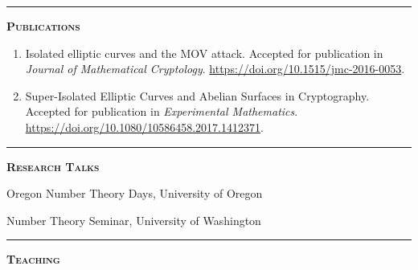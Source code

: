 \documentclass[12pt]{article}
\newcommand{\sectionheading}[1]
{
\bigskip %
\noindent
\hspace{-6.5mm}\textcolor{Gray}{\rule[.75mm]{21.5mm}{1mm}} %
\hspace{.2mm}	%
{\large{\textbf{\textsc{#1}}}} %
}
\newenvironment{date_section}
	{
	\vspace{-1ex}
	\leftmargini = 15ex
		\begin{itemize}[
			labelsep = *,
			labelwidth = 9ex,
			labelindent = 0ex,
			itemindent = !,
			font=\normalfont,
			align=parleft
		]{}
		\itemsep=-1.5mm
	}
	{\end{itemize}\vspace{-2ex}}
\newcommand{\yearmo}[2]{
	\item[
		{\makebox[1ex][r]{#1}}
		\hspace{1ex}
		{\makebox[1ex][l]{#2} }
		] }
\begin{document}
	\sectionheading{Publications}%
	
	\begin{enumerate}[itemsep=-1mm, leftmargin=24mm]
		
		\item
		{Isolated elliptic curves and the MOV attack}.
		Accepted for publication in \textit{Journal of Mathematical Cryptology}. 
		\url{https://doi.org/10.1515/jmc-2016-0053}.
		
		\item
		{Super-Isolated Elliptic Curves and Abelian Surfaces in Cryptography}.
		Accepted for publication in \textit{Experimental Mathematics}.
		\url{https://doi.org/10.1080/10586458.2017.1412371}.
		
	\end{enumerate}

	\sectionheading{Research Talks} %
	
	\begin{date_section}
		
		\yearmo{2017}{Oct.} %
		Oregon Number Theory Days,
		University of Oregon
		
		\yearmo{2017}{May.} %
		Number Theory Seminar,
		University of Washington
		
	\end{date_section}


	\sectionheading{Teaching}%
	
\end{document}
